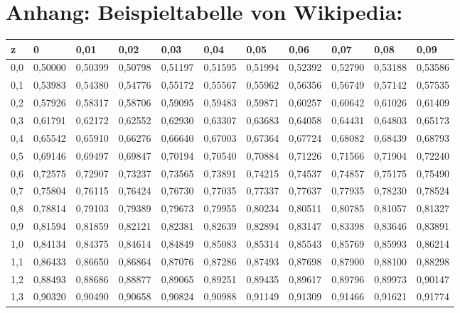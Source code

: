 \documentclass[12pt,a4paper,twocolumn]{article}
\begin{document}
\onecolumn
\pagebreak

\section*{Anhang: Beispieltabelle von Wikipedia:}
\begin{tabular}{l|l|l|l|l|l|l|l|l|l|l}
z & 0 & 0,01 & 0,02 & 0,03 & 0,04 & 0,05 & 0,06 & 0,07 & 0,08 & 0,09\\ \hline
0,0 & 0,50000 & 0,50399 & 0,50798 & 0,51197 & 0,51595 & 0,51994 & 0,52392 & 0,52790 & 0,53188 & 0,53586\\ \hline
0,1 & 0,53983 & 0,54380 & 0,54776 & 0,55172 & 0,55567 & 0,55962 & 0,56356 & 0,56749 & 0,57142 & 0,57535\\ \hline
0,2 & 0,57926 & 0,58317 & 0,58706 & 0,59095 & 0,59483 & 0,59871 & 0,60257 & 0,60642 & 0,61026 & 0,61409\\ \hline
0,3 & 0,61791 & 0,62172 & 0,62552 & 0,62930 & 0,63307 & 0,63683 & 0,64058 & 0,64431 & 0,64803 & 0,65173\\ \hline
0,4 & 0,65542 & 0,65910 & 0,66276 & 0,66640 & 0,67003 & 0,67364 & 0,67724 & 0,68082 & 0,68439 & 0,68793\\ \hline
0,5 & 0,69146 & 0,69497 & 0,69847 & 0,70194 & 0,70540 & 0,70884 & 0,71226 & 0,71566 & 0,71904 & 0,72240\\ \hline
0,6 & 0,72575 & 0,72907 & 0,73237 & 0,73565 & 0,73891 & 0,74215 & 0,74537 & 0,74857 & 0,75175 & 0,75490\\ \hline
0,7 & 0,75804 & 0,76115 & 0,76424 & 0,76730 & 0,77035 & 0,77337 & 0,77637 & 0,77935 & 0,78230 & 0,78524\\ \hline
0,8 & 0,78814 & 0,79103 & 0,79389 & 0,79673 & 0,79955 & 0,80234 & 0,80511 & 0,80785 & 0,81057 & 0,81327\\ \hline
0,9 & 0,81594 & 0,81859 & 0,82121 & 0,82381 & 0,82639 & 0,82894 & 0,83147 & 0,83398 & 0,83646 & 0,83891\\ \hline
1,0 & 0,84134 & 0,84375 & 0,84614 & 0,84849 & 0,85083 & 0,85314 & 0,85543 & 0,85769 & 0,85993 & 0,86214\\ \hline
1,1 & 0,86433 & 0,86650 & 0,86864 & 0,87076 & 0,87286 & 0,87493 & 0,87698 & 0,87900 & 0,88100 & 0,88298\\ \hline
1,2 & 0,88493 & 0,88686 & 0,88877 & 0,89065 & 0,89251 & 0,89435 & 0,89617 & 0,89796 & 0,89973 & 0,90147\\ \hline
1,3 & 0,90320 & 0,90490 & 0,90658 & 0,90824 & 0,90988 & 0,91149 & 0,91309 & 0,91466 & 0,91621 & 0,91774\\ \hline

\end{tabular}
\end{document}
